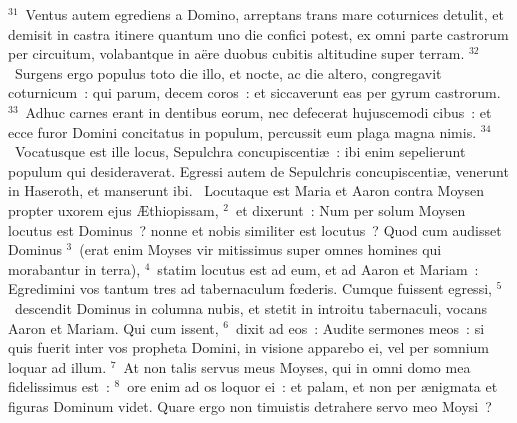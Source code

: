 ${}^{31}$~Ventus autem egrediens a Domino, arreptans trans mare coturnices detulit, et demisit in castra itinere quantum uno die confici potest, ex omni parte castrorum per circuitum, volabantque in a\"ere duobus cubitis altitudine super terram.
${}^{32}$~Surgens ergo populus toto die illo, et nocte, ac die altero, congregavit coturnicum~: qui parum, decem coros~: et siccaverunt eas per gyrum castrorum.
${}^{33}$~Adhuc carnes erant in dentibus eorum, nec defecerat hujuscemodi cibus~: et ecce furor Domini concitatus in populum, percussit eum plaga magna nimis.
${}^{34}$~Vocatusque est ille locus, Sepulchra concupiscenti\ae~: ibi enim sepelierunt populum qui desideraverat. Egressi autem de Sepulchris concupiscenti\ae , venerunt in Haseroth, et manserunt ibi.
~Locutaque est Maria et Aaron contra Moysen propter uxorem ejus \AE thiopissam,
${}^{2}$~et dixerunt~: Num per solum Moysen locutus est Dominus~? nonne et nobis similiter est locutus~? Quod cum audisset Dominus
${}^{3}$~(erat enim Moyses vir mitissimus super omnes homines qui morabantur in terra),
${}^{4}$~statim locutus est ad eum, et ad Aaron et Mariam~: Egredimini vos tantum tres ad tabernaculum fœderis. Cumque fuissent egressi,
${}^{5}$~descendit Dominus in columna nubis, et stetit in introitu tabernaculi, vocans Aaron et Mariam. Qui cum issent,
${}^{6}$~dixit ad eos~: Audite sermones meos~: si quis fuerit inter vos propheta Domini, in visione apparebo ei, vel per somnium loquar ad illum.
${}^{7}$~At non talis servus meus Moyses, qui in omni domo mea fidelissimus est~:
${}^{8}$~ore enim ad os loquor ei~: et palam, et non per \ae nigmata et figuras Dominum videt. Quare ergo non timuistis detrahere servo meo Moysi~?


